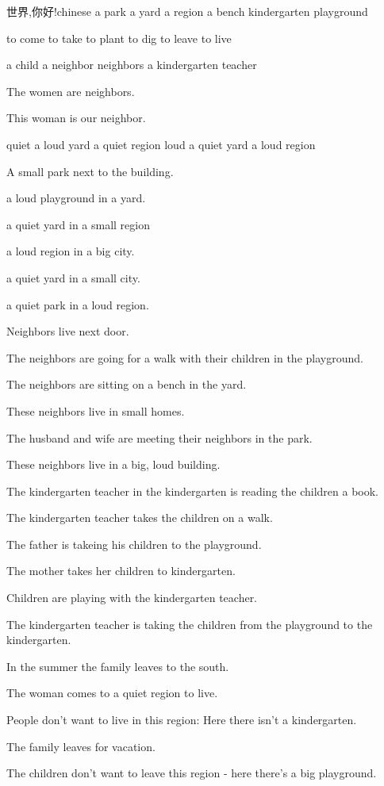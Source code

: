 \documentclass[11pt,a4paper]{article}
\begin{document}
世界,你好!chinese
a park a yard a region a bench kindergarten playground

to come to take to plant to dig to leave to live

a child a neighbor neighbors a kindergarten teacher

The women are neighbors.

This woman is our neighbor.

quiet a loud yard a quiet region loud a quiet yard a loud region

A small park next to the building.

a loud playground in a yard.

a quiet yard in a small region

a loud region in a big city.

a quiet yard in a small city.

a quiet park in a loud region.

Neighbors live next door.

The neighbors are going for a walk with their children in the playground.

The neighbors are sitting on a bench in the yard.

These neighbors live in small homes.

The husband and wife are meeting their neighbors in the park.

These neighbors live in a big, loud building.

The kindergarten teacher in the kindergarten is reading the children a book.

The kindergarten teacher takes the children on a walk.

The father is takeing his children to the playground.

The mother takes her children to kindergarten.

Children are playing with the kindergarten teacher.

The kindergarten teacher is taking the children from the playground to the
kindergarten.

In the summer the family leaves to the south.

The woman comes to a quiet region to live.

People don't want to live in this region: Here there isn't a kindergarten.

The family leaves for vacation.

The children don't want to leave this region - here there's a big playground.
\end{document}
